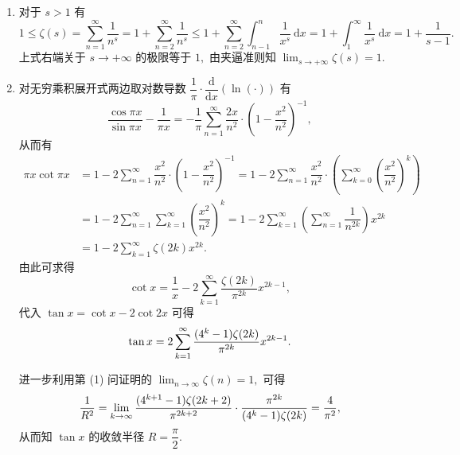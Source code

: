 \begin{solution}
\begin{enumerate}
\item 对于 $s > 1$ 有
\begin{equation*}
1 \leqslant \zeta(s) = \sum_{n=1}^\infty \frac1{n^s} = 1 + \sum_{n=2}^\infty \frac1{n^s} \leqslant 1 + \sum_{n=2}^\infty \int_{n-1}^n \frac{1}{x^s} ~ \mathrm{d}x = 1 + \int_1^\infty \frac{1}{x^s} ~ \mathrm{d}x = 1 + \frac{1}{s-1}.
\end{equation*}
上式右端关于 $s \to +\infty$ 的极限等于 $1,$ 由夹逼准则知 $\displaystyle \lim_{s \to +\infty} \zeta(s) = 1.$ 

\item 对无穷乘积展开式两边取对数导数 $\displaystyle \dfrac{1}{\pi} \cdot \dfrac{\mathrm{d}}{\mathrm{d} x} \left( \ln (\cdot) \right)$ 有
\begin{equation*}
\dfrac{\cos \pi x}{\sin \pi x} - \dfrac{1}{\pi x}
= -\dfrac{1}{\pi} \sum_{n=1}^\infty \dfrac{2x}{n^2} \cdot \left( 1 - \dfrac{x^2}{n^2} \right)^{-1},
\end{equation*}
从而有
\begin{align*}
\pi x \cot \pi x
& = 1 - 2 \sum_{n=1}^\infty \dfrac{x^2}{n^2} \cdot \left( 1 - \dfrac{x^2}{n^2} \right)^{-1} = 1 - 2 \sum_{n=1}^\infty \dfrac{x^2}{n^2} \cdot \left( \sum_{k=0}^\infty \left( \dfrac{x^2}{n^2} \right)^k \right) \\
& = 1 - 2 \sum_{n=1}^\infty \sum_{k=1}^\infty \left( \dfrac{x^2}{n^2} \right)^k = 1 - 2 \sum_{k=1}^\infty \left( \sum_{n=1}^\infty \dfrac{1}{n^{2k}} \right) x^{2k} \\
& = 1 - 2 \sum_{k=1}^\infty \zeta(2k) x^{2k}.
\end{align*}
由此可求得
\begin{equation*}
\cot x = \dfrac{1}{x} - 2 \sum_{k=1}^\infty \dfrac{\zeta(2k)}{\pi^{2k}} x^{2k-1},
\end{equation*}
代入 $\tan x = \cot x - 2 \cot 2x$ 可得
\begin{equation*}
\tan x = 2 \sum_{k=1}^\infty \dfrac{(4^k - 1)\zeta(2k)}{\pi^{2k}} x^{2k-1}. \score{2}
\end{equation*}

进一步利用第 (1) 问证明的 $\displaystyle \lim_{n\to\infty} \zeta(n) = 1,$ 可得
\begin{equation*}
\dfrac{1}{R^2} = \lim_{k\to\infty} \dfrac{(4^{k+1} - 1)\zeta(2k+2)}{\pi^{2k+2}}
  \cdot \dfrac{\pi^{2k}}{(4^k - 1)\zeta(2k)}
= \dfrac{4}{\pi^2}, \score{2}
\end{equation*}
从而知 $\tan x$ 的收敛半径 $\displaystyle R = \dfrac{\pi}{2}.$ 


\end{enumerate}
\end{solution}
